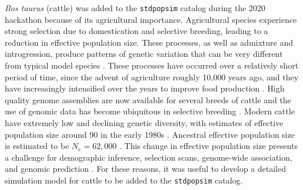 \documentclass[hidelinks]{article}
\newcommand{\stdpopsim}{\texttt{stdpopsim}\xspace}
\begin{document}
\emph{Bos taurus} (cattle) was added to the \stdpopsim catalog during the 2020 hackathon because of its agricultural importance. Agricultural species experience
strong selection due to domestication and selective breeding, leading
to a reduction in effective population size. These processes,
as well as admixture and introgression, produce patterns
of genetic variation that can be very different from typical model
species \citep{Larson2013}. These processes have occurred over a
relatively short period of time, since the advent of agriculture roughly 10,000 years ago, and they have increasingly intensified over the years to improve food production \citep{Gaut2018,MacLeod2013}. High quality genome assemblies are now
available for several breeds of cattle \citep[e.g.,][]{Rosen2020, Heaton2021,
Talenti2022} and the use of genomic data has become ubiquitous
in selective breeding \citep{Meuwissen2001,MacLeod2014, Obsteter2021, Cesarani2022}.
Modern cattle have extremely low and declining genetic diversity,
with estimates of effective population size around 90 in the early 1980s \citep{MacLeod2013, VanRaden2020, Makanjouloa2020}.
Ancestral effective population size is estimated to be $N_e=62,000$ \citep{MacLeod2013}.
This change in effective population size presents a challenge for demographic inference, 
selection scans, genome-wide association, and genomic prediction
\citep{MacLeod2013,MacLeod2014,Hartfield2022}. 
For these reasons, it was useful to develop a detailed simulation model for cattle to be added to the \stdpopsim catalog.
\end{document}
